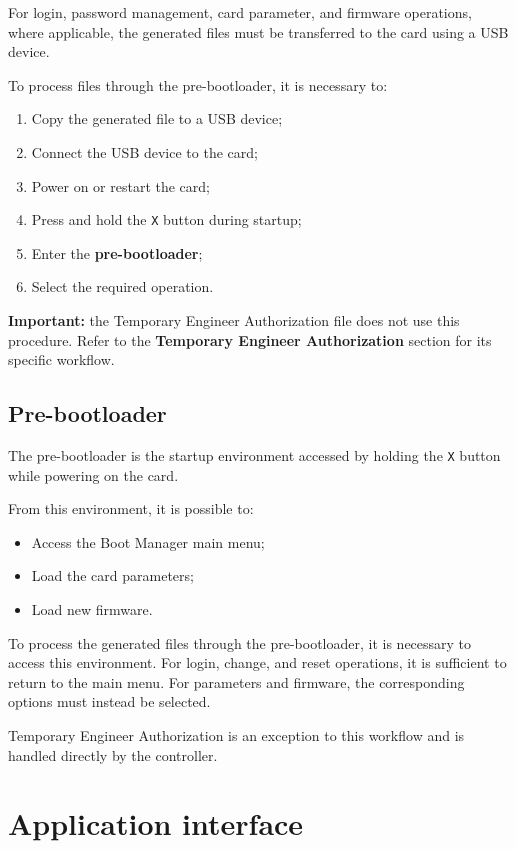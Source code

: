 ﻿\documentclass[11pt,a4paper]{article}
\newcommand{\button}[1]{\textbf{#1}}
\begin{document}
For login, password management, card parameter, and firmware
operations, where applicable, the generated files must be
transferred to the card using a USB device.

To process files through the pre-bootloader, it is necessary to:

\begin{enumerate}
    \item Copy the generated file to a USB device;
    \item Connect the USB device to the card;
    \item Power on or restart the card;
    \item Press and hold the \texttt{X} button during startup;
    \item Enter the \textbf{pre-bootloader};
    \item Select the required operation.
\end{enumerate}

\textbf{Important:} the Temporary Engineer Authorization file
does not use this procedure. Refer to the
\button{Temporary Engineer Authorization} section for its
specific workflow.

\subsection{Pre-bootloader}

The pre-bootloader is the startup environment accessed by holding
the \texttt{X} button while powering on the card.

From this environment, it is possible to:

\begin{itemize}
    \item Access the Boot Manager main menu;
    \item Load the card parameters;
    \item Load new firmware.
\end{itemize}

To process the generated files through the pre-bootloader, it is
necessary to access this environment. For login, change, and reset
operations, it is sufficient to return to the main menu. For
parameters and firmware, the corresponding options must instead
be selected.

Temporary Engineer Authorization is an exception to this workflow
and is handled directly by the controller.

\section{Application interface}
\end{document}
